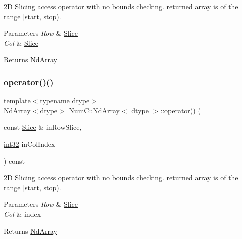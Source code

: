 2D Slicing access operator with no bounds checking. returned array is of the range \mbox{[}start, stop).


\begin{DoxyParams}{Parameters}
{\em Row} & \mbox{\hyperlink{class_num_c_1_1_slice}{Slice}} \\
\hline
{\em Col} & \mbox{\hyperlink{class_num_c_1_1_slice}{Slice}} \\
\hline
\end{DoxyParams}
\begin{DoxyReturn}{Returns}
\mbox{\hyperlink{class_num_c_1_1_nd_array}{Nd\+Array}} 
\end{DoxyReturn}
\mbox{\label{class_num_c_1_1_nd_array_abc89e90ee2777842c911f640c8d86228}} 
\subsubsection{\texorpdfstring{operator()()}{operator()()}\hspace{0.1cm}{\footnotesize\ttfamily [4/5]}}
{\footnotesize\ttfamily template$<$typename dtype$>$ \\
\mbox{\hyperlink{class_num_c_1_1_nd_array}{Nd\+Array}}$<$dtype$>$ \mbox{\hyperlink{class_num_c_1_1_nd_array}{Num\+C\+::\+Nd\+Array}}$<$ dtype $>$\+::operator() (\begin{DoxyParamCaption}\item[{const \mbox{\hyperlink{class_num_c_1_1_slice}{Slice}} \&}]{in\+Row\+Slice,  }\item[{\mbox{\hyperlink{namespace_num_c_aa5a7e69266097d55816d4cdb19542b53}{int32}}}]{in\+Col\+Index }\end{DoxyParamCaption}) const\hspace{0.3cm}{\ttfamily [inline]}}

2D Slicing access operator with no bounds checking. returned array is of the range \mbox{[}start, stop).


\begin{DoxyParams}{Parameters}
{\em Row} & \mbox{\hyperlink{class_num_c_1_1_slice}{Slice}} \\
\hline
{\em Col} & index \\
\hline
\end{DoxyParams}
\begin{DoxyReturn}{Returns}
\mbox{\hyperlink{class_num_c_1_1_nd_array}{Nd\+Array}} 
\end{DoxyReturn}
\mbox{\label{class_num_c_1_1_nd_array_a6f395ba86e934cc3291c6dbb1f89c13e}} 
